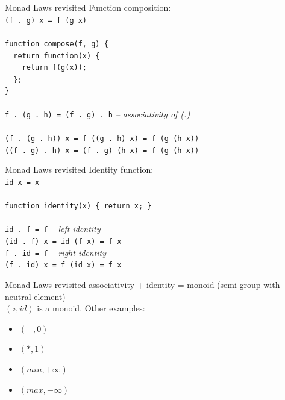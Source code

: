 \documentclass{beamer}
\begin{document}
\begin{frame}{Monad Laws revisited}
  Function composition: \\ \pause
  \texttt{(f\ .\ g) x = f (g x)} \\ \pause
  \ \\
  \texttt{function compose(f, g) \{ \\
    \ \ return function(x) \{ \\
    \ \ \ \ return f(g(x)); \\
    \ \ \}; \\
    \} } \\ \pause
  \ \\
  \texttt{f\ .\ (g\ .\ h) = (f\ .\ g)\ .\ h}
  \pause \textit{-- associativity of (.)} \\ \pause
  \ \\
  \texttt{(f\ .\ (g\ .\ h)) x \pause = f ((g\ .\ h) x) \pause = f (g (h x))} \\ \pause
  \texttt{((f\ .\ g)\ .\ h) x \pause = (f\ .\ g) (h x) \pause = f (g (h x))} 
  
\end{frame}

\begin{frame}{Monad Laws revisited}
  Identity function: \\ \pause
  \texttt{id x = x} \\ \pause
  \ \\
  \texttt{function identity(x) \{ return x; \}} \\ \pause
  \ \\
  \texttt{id\ .\ f = f} \pause \textit{-- left identity} \\ \pause
  \texttt{(id\ .\ f) x \pause = id (f x) \pause = f x} \\ \pause
  \texttt{f\ .\ id = f} \pause \textit{-- right identity} \\ \pause
  \texttt{(f\ .\ id) x \pause = f (id x) \pause = f x}
\end{frame}

\begin{frame}{Monad Laws revisited}
  associativity + identity = monoid \pause (semi-group with neutral element) \\
  $(\circ, id)$ is a monoid. Other examples:\pause
  \begin{itemize}
  \item $(+, 0)$ \pause
  \item $(*, 1)$ \pause
  \item $(min, +\infty)$ \pause
  \item $(max, -\infty)$
  \end{itemize}
\end{frame}
\end{document}

